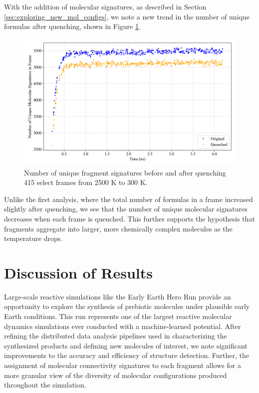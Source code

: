 With the addition of molecular signatures, as described in Section \ref{sec:exploring_new_mol_configs}, we note a new trend in the number of unique formulas after quenching, shown in Figure \ref{fig:415_new_formulas}.

\begin{figure}[!ht]
    \centering
    \includegraphics[width=1\linewidth]{Images/early_earth/new_415_quench_formula_vs_frame.png}
    \caption[Unique fragment signatures before and after quenching]{Number of unique fragment signatures before and after quenching 415 select frames from 2500 K to 300 K.}
    \label{fig:415_new_formulas}
\end{figure}

Unlike the first analysis, where the total number of formulas in a frame increased slightly after quenching, we see that the number of unique molecular signatures decreases when each frame is quenched.
This further supports the hypothesis that fragments aggregate into larger, more chemically complex molecules as the temperature drops.

\section{Discussion of Results}
\label{sec:hero_run_interpretation}

Large-scale reactive simulations like the Early Earth Hero Run provide an opportunity to explore the synthesis of prebiotic molecules under plausible early Earth conditions.
This run represents one of the largest reactive molecular dynamics simulations ever conducted with a machine-learned potential. 
After refining the distributed data analysis pipelines used in characterizing the synthesized products and defining new molecules of interest, we note significant improvements to the accuracy and efficiency of structure detection.
Further, the assignment of molecular connectivity signatures to each fragment allows for a more granular view of the diversity of molecular configurations produced throughout the simulation.

